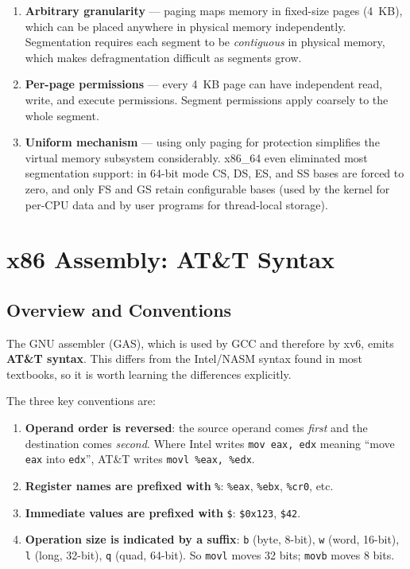 \documentclass[11pt]{article}
\begin{document}
\begin{enumerate}
    \item \textbf{Arbitrary granularity} --- paging maps memory in fixed-size pages (4~KB),
          which can be placed anywhere in physical memory independently. Segmentation requires
          each segment to be \emph{contiguous} in physical memory, which makes defragmentation
          difficult as segments grow.
    \item \textbf{Per-page permissions} --- every 4~KB page can have independent read, write,
          and execute permissions. Segment permissions apply coarsely to the whole segment.
    \item \textbf{Uniform mechanism} --- using only paging for protection simplifies the
          virtual memory subsystem considerably. x86\_64 even eliminated most segmentation
          support: in 64-bit mode CS, DS, ES, and SS bases are forced to zero, and only FS
          and GS retain configurable bases (used by the kernel for per-CPU data and by user
          programs for thread-local storage).
\end{enumerate}

\section{x86 Assembly: AT\&T Syntax}

\subsection{Overview and Conventions}

The GNU assembler (GAS), which is used by GCC and therefore by xv6, emits
\textbf{AT\&T syntax}. This differs from the Intel/NASM syntax found in most textbooks, so
it is worth learning the differences explicitly.

The three key conventions are:

\begin{enumerate}
    \item \textbf{Operand order is reversed}: the source operand comes \emph{first} and the
          destination comes \emph{second}. Where Intel writes \texttt{mov eax, edx} meaning
          ``move \texttt{eax} into \texttt{edx}'', AT\&T writes \texttt{movl \%eax, \%edx}.
    \item \textbf{Register names are prefixed with} \texttt{\%}: \texttt{\%eax},
          \texttt{\%ebx}, \texttt{\%cr0}, etc.
    \item \textbf{Immediate values are prefixed with} \texttt{\$}: \texttt{\$0x123},
          \texttt{\$42}.
    \item \textbf{Operation size is indicated by a suffix}: \texttt{b} (byte, 8-bit),
          \texttt{w} (word, 16-bit), \texttt{l} (long, 32-bit), \texttt{q} (quad, 64-bit).
          So \texttt{movl} moves 32 bits; \texttt{movb} moves 8 bits.
\end{enumerate}
\end{document}
